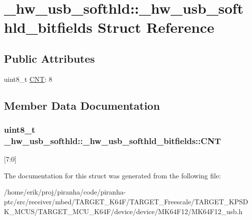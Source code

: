 \hypertarget{struct__hw__usb__softhld_1_1__hw__usb__softhld__bitfields}{}\section{\+\_\+hw\+\_\+usb\+\_\+softhld\+:\+:\+\_\+hw\+\_\+usb\+\_\+softhld\+\_\+bitfields Struct Reference}
\label{struct__hw__usb__softhld_1_1__hw__usb__softhld__bitfields}
\subsection*{Public Attributes}
\begin{DoxyCompactItemize}
\item 
uint8\+\_\+t \hyperlink{struct__hw__usb__softhld_1_1__hw__usb__softhld__bitfields_a4418e1179699ef32563324481899f37a}{C\+NT}\+: 8
\end{DoxyCompactItemize}


\subsection{Member Data Documentation}
\subsubsection[{\texorpdfstring{C\+NT}{CNT}}]{\setlength{\rightskip}{0pt plus 5cm}uint8\+\_\+t \+\_\+hw\+\_\+usb\+\_\+softhld\+::\+\_\+hw\+\_\+usb\+\_\+softhld\+\_\+bitfields\+::\+C\+NT}\hypertarget{struct__hw__usb__softhld_1_1__hw__usb__softhld__bitfields_a4418e1179699ef32563324481899f37a}{}\label{struct__hw__usb__softhld_1_1__hw__usb__softhld__bitfields_a4418e1179699ef32563324481899f37a}
\mbox{[}7\+:0\mbox{]} 

The documentation for this struct was generated from the following file\+:\begin{DoxyCompactItemize}
\item 
/home/erik/proj/piranha/code/piranha-\/ptc/src/receiver/mbed/\+T\+A\+R\+G\+E\+T\+\_\+\+K64\+F/\+T\+A\+R\+G\+E\+T\+\_\+\+Freescale/\+T\+A\+R\+G\+E\+T\+\_\+\+K\+P\+S\+D\+K\+\_\+\+M\+C\+U\+S/\+T\+A\+R\+G\+E\+T\+\_\+\+M\+C\+U\+\_\+\+K64\+F/device/device/\+M\+K64\+F12/M\+K64\+F12\+\_\+usb.\+h\end{DoxyCompactItemize}

